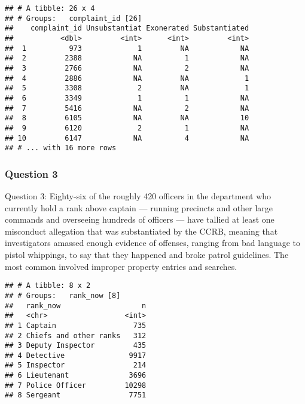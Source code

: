 \documentclass[
]{article}
\newenvironment{Shaded}{\begin{snugshade}}{\end{snugshade}}
\newcommand{\CommentTok}[1]{\textcolor[rgb]{0.56,0.35,0.01}{\textit{#1}}}
\newcommand{\KeywordTok}[1]{\textcolor[rgb]{0.13,0.29,0.53}{\textbf{#1}}}
\newcommand{\NormalTok}[1]{#1}
\newcommand{\OperatorTok}[1]{\textcolor[rgb]{0.81,0.36,0.00}{\textbf{#1}}}
\newcommand{\StringTok}[1]{\textcolor[rgb]{0.31,0.60,0.02}{#1}}
\begin{document}
\begin{verbatim}
## # A tibble: 26 x 4
## # Groups:   complaint_id [26]
##    complaint_id Unsubstantiat Exonerated Substantiated
##           <dbl>         <int>      <int>         <int>
##  1          973             1         NA            NA
##  2         2388            NA          1            NA
##  3         2766            NA          2            NA
##  4         2886            NA         NA             1
##  5         3308             2         NA             1
##  6         3349             1          1            NA
##  7         5416            NA          2            NA
##  8         6105            NA         NA            10
##  9         6120             2          1            NA
## 10         6147            NA          4            NA
## # ... with 16 more rows
\end{verbatim}

\hypertarget{question-3}{%
\subsubsection{Question 3}\label{question-3}}

Question 3: Eighty-six of the roughly 420 officers in the department who
currently hold a rank above captain --- running precincts and other
large commands and overseeing hundreds of officers --- have tallied at
least one misconduct allegation that was substantiated by the CCRB,
meaning that investigators amassed enough evidence of offenses, ranging
from bad language to pistol whippings, to say that they happened and
broke patrol guidelines. The most common involved improper property
entries and searches.

\begin{Shaded}
\end{Shaded}

\begin{verbatim}
## # A tibble: 8 x 2
## # Groups:   rank_now [8]
##   rank_now                   n
##   <chr>                  <int>
## 1 Captain                  735
## 2 Chiefs and other ranks   312
## 3 Deputy Inspector         435
## 4 Detective               9917
## 5 Inspector                214
## 6 Lieutenant              3696
## 7 Police Officer         10298
## 8 Sergeant                7751
\end{verbatim}
\end{document}
